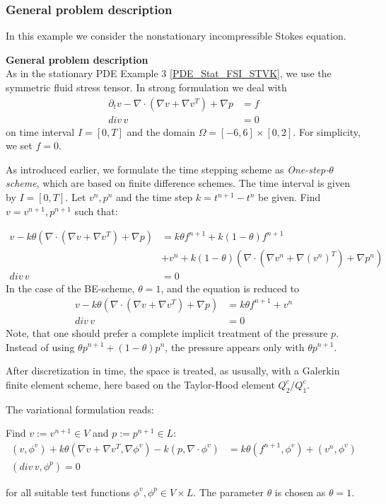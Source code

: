 \subsubsection{General problem description}
In this example we consider the nonstationary incompressible Stokes equation. 

\textbf{General problem description}\\
As in the stationary PDE Example 3 \ref{PDE_Stat_FSI_STVK},
we use the symmetric fluid stress tensor.  
In strong formulation we deal with 
\begin{align*}
\partial_t v -\nabla\cdot (\nabla v + \nabla v^{T}) + \nabla p &= f \\
div\, v &= 0 
\end{align*}
on time interval $I=[0,T]$ and the domain 
$\Omega = [-6,6]\times [0,2]$. For simplicity,  we set $f=0$.

As introduced earlier, 
we formulate the time stepping scheme as \textit{One-step-$\theta$ scheme},
which are based on finite difference schemes. 
The time interval is given by $I=[0,T]$. Let $v^n,p^n$ and the time
step $k=t^{n+1}-t^n$ be given. Find $v=v^{n+1}, p^{n+1}$ such that:

\begin{align*}
v - k\theta (\nabla\cdot (\nabla v + \nabla v^{T}) + \nabla p) &=
k\theta f^{n+1} + k(1-\theta)f^{n+1}\\
&+  v^n + k(1-\theta) (\nabla\cdot (\nabla v^n + \nabla (v^n)^{T}) 
+ \nabla p^n) \\
div \,v &= 0 
\end{align*}
In the case of the BE-scheme, $\theta = 1$, and the equation is reduced to
\begin{align*}
v - k\theta (\nabla\cdot (\nabla v + \nabla v^{T}) + \nabla p) &=
k\theta f^{n+1} +  v^n  \\
div \,v &= 0
\end{align*}
Note, that one should prefer a complete implicit treatment of the
pressure $p$. Instead of using $\theta p^{n+1} + (1-\theta)p^n$, the pressure
appears only with $\theta p^{n+1}$.

After discretization in time, the space is treated, as ususally, with 
a Galerkin finite element scheme, here based on the Taylor-Hood element 
$Q_2^c / Q_1^c$.

The variational formulation reads:

\begin{Problem}
Find $v:= v^{n+1}\in V$ and $p:= p^{n+1}\in L$:
\begin{align*}
(v,\phi^v) + k\theta (\nabla v + \nabla v^{T}, \nabla\phi^v) 
- k  (p, \nabla\cdot\phi^v) &=
k\theta (f^{n+1},\phi^v) +  (v^n,\phi^v)\\
(div \,v,\phi^p) = 0  
\end{align*}
\end{Problem}
for all suitable test functions ${\phi^v , \phi^p} \in V\times L$. 
The parameter $\theta$ is chosen as $\theta =1$.

